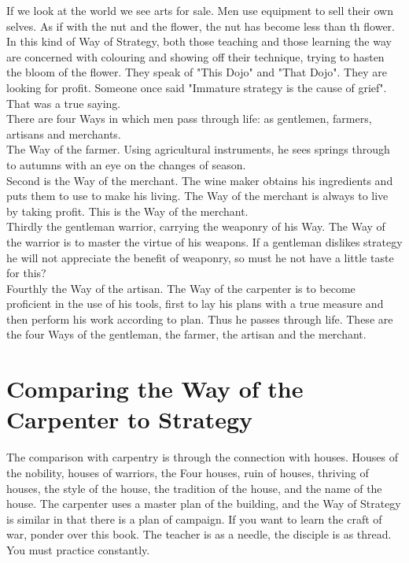 If we look at the world we see arts for sale. Men use equipment to sell their own selves. As if with the nut and the flower, the nut has become less than th flower. In this kind of Way of Strategy, both those teaching and those learning the way are concerned with colouring and showing off their technique, trying to hasten the bloom of the flower. They speak of "This Dojo" and "That Dojo". They are looking for profit. Someone once said "Immature strategy is the cause of grief". That was a true saying.\\

There are four Ways in which men pass through life: as gentlemen, farmers, artisans and merchants.\\

The Way of the farmer. Using agricultural instruments, he sees springs through to autumns with an eye on the changes of season.\\

Second is the Way of the merchant. The wine maker obtains his ingredients and puts them to use to make his living. The Way of the merchant is always to live by taking profit. This is the Way of the merchant.\\

\nopagebreak Thirdly the gentleman warrior, carrying the weaponry of his Way. The Way of the warrior is to master the virtue of his weapons. If a gentleman dislikes strategy he will not appreciate the benefit of weaponry, so must he not have a little taste for this?\\

Fourthly the Way of the artisan. The Way of the carpenter is to become proficient in the use of his tools, first to lay his plans with a true measure and then perform his work according to plan. Thus he passes through life. These are the four Ways of the gentleman, the farmer, the artisan and the merchant.\\
\section{Comparing the Way of the Carpenter to Strategy}

The comparison with carpentry is through the connection with houses. Houses of the nobility, houses of warriors, the Four houses, ruin of houses, thriving of houses, the style of the house, the tradition of the house, and the name of the house. The carpenter uses a master plan of the building, and the Way of Strategy is similar in that there is a plan of campaign. If you want to learn the craft of war, ponder over this book. The teacher is as a needle, the disciple is as thread. You must practice constantly.\\

